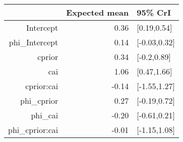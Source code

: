 \begin{tabular}{rrl}
  \hline
 & Expected mean & 95\% CrI \\ 
  \hline
Intercept & 0.36 & [0.19,0.54] \\ 
  phi\_Intercept & 0.14 & [-0.03,0.32] \\ 
  cprior & 0.34 & [-0.2,0.89] \\ 
  cai & 1.06 & [0.47,1.66] \\ 
  cprior:cai & -0.14 & [-1.55,1.27] \\ 
  phi\_cprior & 0.27 & [-0.19,0.72] \\ 
  phi\_cai & -0.20 & [-0.61,0.21] \\ 
  phi\_cprior:cai & -0.01 & [-1.15,1.08] \\ 
   \hline
\end{tabular}

